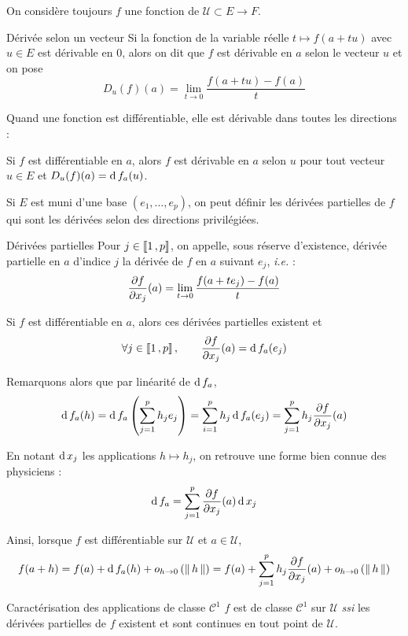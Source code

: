     On considère toujours $f$ une fonction de $\mathcal{U} \subset E \to F$.

    \begin{defi}{Dérivée selon un vecteur}{}
        Si la fonction de la variable réelle $t \mapsto f(a + tu)$ avec $u \in E$ est dérivable en 0, alors on dit que $f$ est dérivable en $a$ selon le vecteur $u$ et on pose 
        \[ D_u(f)(a) = \lim_{t \to 0} \frac{f(a + tu) - f(a)}{t} \]   
    \end{defi}

    Quand une fonction est différentiable, elle est dérivable dans toutes les directions :

    \begin{prop}{}{}
        Si $f$ est différentiable en $a$, alors $f$ est dérivable en $a$ selon $u$ pour tout vecteur $u \in E$  et $D_u(f)(a) = \operatorname{d} f_a(u)$. 
    \end{prop}

    Si $E$ est muni d’une base $(e_1,\ldots,e_p)$, on peut définir les dérivées partielles de $f$ qui sont les dérivées selon des directions privilégiées.

    \begin{defi}{Dérivées partielles}{}
        Pour $j \in \left\llbracket 1 \, , p \right\rrbracket$, on appelle, sous réserve d’existence, dérivée partielle en $a$ d’indice $j$ la dérivée de $f$ en $a$ suivant $e_j$, \textit{i.e.} : 
        \[ \frac{\partial f}{\partial x_j}(a) = \lim_{t \to 0} \frac{f(a + t e_j) - f(a)}{t} \]    
    \end{defi}

    Si $f$ est différentiable en $a$, alors ces dérivées partielles existent et 
    \[ \forall j \in \left\llbracket 1 \, , p \right\rrbracket, \qquad \frac{\partial f}{\partial x_j}(a) = \operatorname{d} f_a(e_j) \]    

    Remarquons alors que par linéarité de $\operatorname{d} f_a$, 
    \[ \operatorname{d} f_a(h) = \operatorname{d} f_a\left(\sum_{j=1}^{p} h_j e_j\right) = \sum_{i=1}^{p} h_j \operatorname{d} f_a(e_j) = \sum_{j=1}^{p} h_j \frac{\partial f}{\partial x_j}(a) \]    

    En notant $\operatorname{d} x_j$ les applications $h \mapsto h_j$, on retrouve une forme bien connue des physiciens : 
    \[ \operatorname{d} f_a = \sum_{j=1}^{p} \frac{\partial f}{\partial x_j}(a) \operatorname{d} x_j \]   
    
    Ainsi, lorsque $f$ est différentiable sur $\mathcal{U}$ et $a \in \mathcal{U}$,
    \[ f(a + h) = f(a) + \operatorname{d} f_a(h) + o_{h \rightarrow 0} \left(\left\lVert\,h\,\right\rVert\right) = f(a) + \sum_{j=1}^{p} h_j \frac{\partial f}{\partial x_j}(a) + o_{h \rightarrow 0} \left(\left\lVert\,h\,\right\rVert\right) \]    

    \begin{theo}{Caractérisation des applications de classe $\mathcal{C}^1$}{}
        $f$ est de classe $\mathcal{C}^1$ sur $\mathcal{U}$ \textit{ssi} les dérivées partielles de $f$ existent et sont continues en tout point de $\mathcal{U}$.
    \end{theo}


